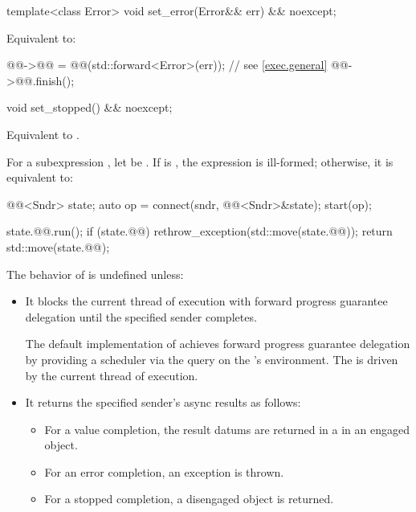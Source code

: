 \begin{itemdecl}
template<class Error>
void set_error(Error&& err) && noexcept;
\end{itemdecl}

\begin{itemdescr}
\pnum
\effects
Equivalent to:
\begin{codeblock}
@@->@@ = @@(std::forward<Error>(err));    // see \ref{exec.general}
@@->@@.finish();
\end{codeblock}
\end{itemdescr}

\begin{itemdecl}
void set_stopped() && noexcept;
\end{itemdecl}

\begin{itemdescr}
\pnum
\effects
Equivalent to .
\end{itemdescr}

\pnum
For a subexpression , let  be .
If 
is ,
the expression  is ill-formed;
otherwise, it is equivalent to:
\begin{codeblock}
@@<Sndr> state;
auto op = connect(sndr, @@<Sndr>{&state});
start(op);

state.@@.run();
if (state.@@) {
  rethrow_exception(std::move(state.@@));
}
return std::move(state.@@);
\end{codeblock}

\pnum
The behavior of  is undefined unless:
\begin{itemize}
\item
It blocks the current thread of execution
with forward progress guarantee delegation
until the specified sender completes.
\begin{note}
The default implementation of  achieves
forward progress guarantee delegation by providing a  scheduler
via the  query
on the 's environment.
The  is driven by the current thread of execution.
\end{note}
\item
It returns the specified sender's async results as follows:
\begin{itemize}
\item
For a value completion,
the result datums are returned in
a  in an engaged  object.
\item
For an error completion, an exception is thrown.
\item
For a stopped completion, a disengaged  object is returned.
\end{itemize}
\end{itemize}

